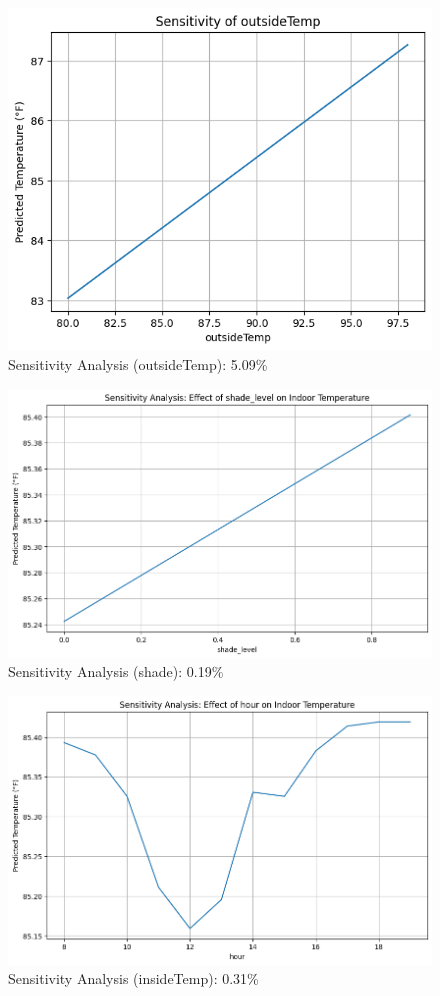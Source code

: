 \documentclass[12pt]{article}
\begin{document}
\begin{figure}
    \centering
    \includegraphics[scale=0.55]{outsideTemp.png}
    \caption{Sensitivity Analysis (outsideTemp): 5.09\% } 
    \label{fig:sensitivityOutside}
\end{figure}
\begin{figure}
    \centering
    \includegraphics[scale=0.6]{shade_level.png}
    \caption{Sensitivity Analysis (shade): 0.19\% } 
    \label{fig:sensitivityShade}
\end{figure}
\begin{figure}
    \centering
    \includegraphics[scale=0.55]{indoorTemp.png}
    \caption{Sensitivity Analysis (insideTemp): 0.31\% } 
    \label{fig:sensitivityIndoor}
\end{figure}
\end{document}
